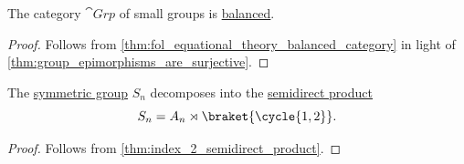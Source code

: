 \begin{corollary}\label{thm:category_of_groups_is_balanced}
  The category \( \hyperref[def:group/category]{\cat{Grp}} \) of small groups is \hyperref[def:balanced_category]{balanced}.
\end{corollary}
\begin{proof}
  Follows from \cref{thm:fol_equational_theory_balanced_category} in light of \cref{thm:group_epimorphisms_are_surjective}.
\end{proof}

\begin{proposition}\label{thm:sn_semidirect_product}
  The \hyperref[def:symmetric_group]{symmetric group} \( S_n \) decomposes into the \hyperref[def:internal_semidirect_product]{semidirect product}
  \begin{equation*}
    S_n = A_n \rtimes \braket{ \cycle{ 1, 2 } }.
  \end{equation*}
\end{proposition}
\begin{proof}
  Follows from \cref{thm:index_2_semidirect_product}.
\end{proof}

